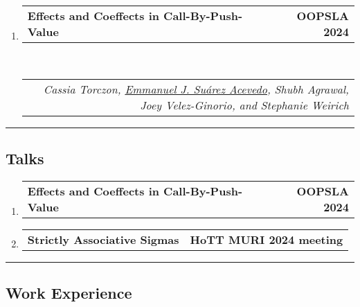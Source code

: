 \documentclass[letterpaper]{article}
\makeatletter
\newcommand*{\tabulardef}[3]{\begin{tabular}[t]{@{}lp{\dimexpr\linewidth-#1}@{}}
    #2&#3
\end{tabular}}
\newcommand{\headerrow}[2]
{\begin{tabular*}{\linewidth}{l@{\extracolsep{\fill}}r}
	#1 &
	#2 \\
\end{tabular*}}
\makeatother
\begin{document}
\begin{enumerate}[label=]
	\parskip=-0.05em
	\item
	\headerrow
        {\textbf{Effects and Coeffects in Call-By-Push-Value}}
		{\textbf{OOPSLA 2024}}
	\\
	\headerrow
        {\tabulardef{6cm}{}{
            \emph{Cassia Torczon, \underline{Emmanuel J. Suárez Acevedo},
            Shubh Agrawal, Joey Velez-Ginorio, and Stephanie Weirich}}}
        {}
\end{enumerate}

\hrule
\subsection*{Talks}
  
\begin{enumerate}[label=]
	\parskip=-0.05em
	\item
	\headerrow
        {\textbf{Effects and Coeffects in Call-By-Push-Value}}
		{\textbf{OOPSLA 2024}}

	\item
	\headerrow
        {\textbf{Strictly Associative Sigmas}}
		{\textbf{HoTT MURI 2024 meeting}}
\end{enumerate}

\hrule
\subsection*{Work Experience}
\end{document}

